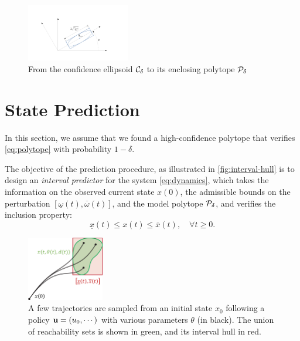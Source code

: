 \documentclass{article}
\begin{document}
\begin{figure}
    \centering
    \includegraphics[trim={3.8cm, 2cm, 5cm, 3.8cm}, clip, width=0.4\textwidth]{img/ellipsoid_to_polytope}
    \caption{From the confidence ellipsoid $\mathcal{C}_\delta$ to its enclosing polytope $\mathcal{P}_\delta$}
    \label{fig:ellipsoid_to_polytope}
\end{figure}

\section{State Prediction}

In this section, we assume that we found a high-confidence polytope that verifies \eqref{eq:polytope} with probability $1-\delta$.

The objective of the prediction procedure, as illustrated in \autoref{fig:interval-hull} is to design an \emph{interval predictor} for the system \eqref{eq:dynamics}, which takes the information on the observed current state ${x}({0})$, the admissible bounds on the perturbation $[\underline{\omega}(t),\overline{\omega}(t)]$, and the model polytope $\mathcal{P}_\delta$, and verifies the inclusion property:
\begin{equation}
\label{eq:interval_property}
\underline{x}(t)\leq x(t)\leq\overline{x}(t),\quad\forall t\geq0.
\end{equation}

\begin{figure}
    \centering
    \includegraphics[width=0.3\textwidth]{img/interval-hull}
    \caption{A few trajectories are sampled from an initial state $x_0$ following a policy $\mathbf{u}=(u_0,\cdots)$ with various parameters $\theta$ (in black). The union of reachability sets is shown in green, and its interval hull in red.}
    \label{fig:interval-hull}
\end{figure}
\end{document}
